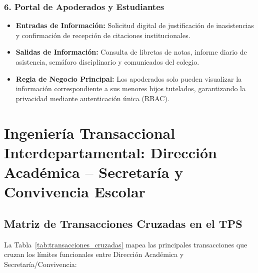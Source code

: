 \documentclass[12pt,a4paper,oneside]{report}
\begin{document}
\subsection{6. Portal de Apoderados y Estudiantes}
    \begin{itemize}
        \item \textbf{Entradas de Información:} Solicitud digital de justificación de inasistencias y confirmación de recepción de citaciones institucionales.
        \item \textbf{Salidas de Información:} Consulta de libretas de notas, informe diario de asistencia, semáforo disciplinario y comunicados del colegio.
        \item \textbf{Regla de Negocio Principal:} Los apoderados solo pueden visualizar la información correspondiente a sus menores hijos tutelados, garantizando la privacidad mediante autenticación única (RBAC).
    \end{itemize}

    \chapter{Ingeniería Transaccional Interdepartamental: Dirección Académica -- Secretaría y Convivencia Escolar}

\section{Matriz de Transacciones Cruzadas en el TPS}

    La Tabla~\ref{tab:transacciones_cruzadas} mapea las principales transacciones que cruzan los límites funcionales entre Dirección Académica y Secretaría/Convivencia:
\end{document}

